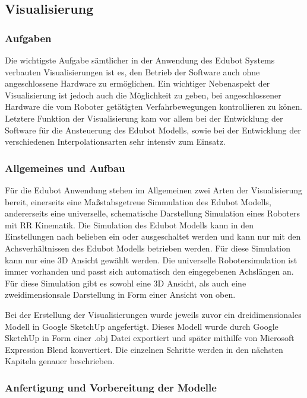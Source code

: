 \subsection{Visualisierung}

\subsubsection{Aufgaben}
Die wichtigste Aufgabe sämtlicher in der Anwendung des Edubot Systems verbauten Visualisierungen ist es, den Betrieb der Software auch ohne angeschlossene Hardware zu ermöglichen. Ein wichtiger Nebenaspekt der Visualisierung ist jedoch auch die Möglichkeit zu geben, bei angeschlossener Hardware die vom Roboter getätigten Verfahrbewegungen kontrollieren zu könen.
Letztere Funktion der Visualisierung kam vor allem bei der Entwicklung der Software für die Ansteuerung des Edubot Modells, sowie bei der Entwicklung der verschiedenen Interpolationsarten sehr intensiv zum Einsatz. 
\subsubsection{Allgemeines und Aufbau}
Für die Edubot Anwendung stehen im Allgemeinen zwei Arten der Visualisierung bereit, einerseits eine Maßstabsgetreue Simmulation des Edubot Modells, andererseits eine universelle, schematische Darstellung Simulation eines Roboters mit RR Kinematik. 
Die Simulation des Edubot Modells kann in den Einstellungen nach belieben ein oder ausgeschaltet werden und kann nur mit den Achsverhältnissen des Edubot Modells betrieben werden. Für diese Simulation kann nur eine 3D Ansicht gewählt werden.
Die universelle Robotersimulation ist immer vorhanden und passt sich automatisch den eingegebenen Achslängen an. Für diese Simulation gibt es sowohl eine 3D Ansicht, als auch eine zweidimensionsale Darstellung in Form einer Ansicht von oben. 

Bei der Erstellung der Visualisierungen wurde jeweils zuvor ein dreidimensionales Modell in Google SketchUp angefertigt. Dieses Modell wurde durch Google SketchUp in Form einer .obj Datei exportiert und später mithilfe von Microsoft Expression Blend konvertiert. Die einzelnen Schritte werden in den nächsten Kapiteln genauer beschrieben.
\subsubsection{Anfertigung und Vorbereitung der Modelle}
